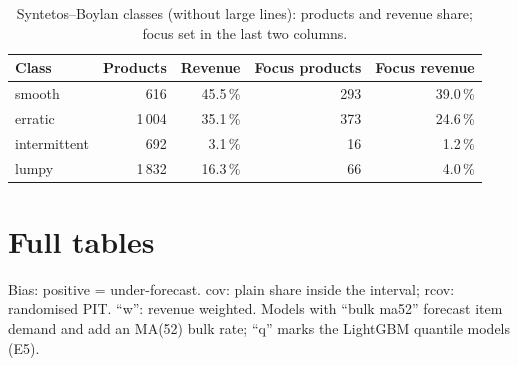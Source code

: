 \documentclass[11pt,a4paper]{article}
\begin{document}
\begin{table}[ht]
  \centering
  \small
  \caption{Syntetos--Boylan classes (without large lines): products and revenue share; focus
    set in the last two columns.}
  \label{tab:sb}
  \begin{tabular}{lrrrr}
    \toprule
    Class & Products & Revenue & Focus products & Focus revenue \\
    \midrule
    smooth & 616 & 45.5\,\% & 293 & 39.0\,\% \\
    erratic & 1\,004 & 35.1\,\% & 373 & 24.6\,\% \\
    intermittent & 692 & 3.1\,\% & 16 & 1.2\,\% \\
    lumpy & 1\,832 & 16.3\,\% & 66 & 4.0\,\% \\
    \bottomrule
  \end{tabular}
\end{table}

\section{Full tables}
\label{app:tables}

Bias: positive = under-forecast. cov: plain share inside the interval; rcov: randomised PIT.
``w'': revenue weighted. Models with ``bulk ma52'' forecast item demand and add an MA(52) bulk
rate; ``q'' marks the LightGBM quantile models (E5).
\end{document}
